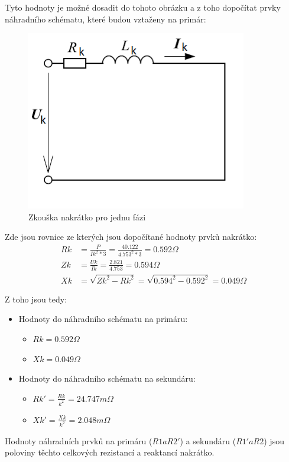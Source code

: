 \documentclass{protokol}
\begin{document}
Tyto hodnoty je možné dosadit do tohoto obrázku a z toho dopočítat prvky náhradního schématu, které budou vztaženy na primár:
\begin{figure}[H]
    \centering
    \includegraphics[width=0.5\linewidth]{ZkouskaNakratko.png}
    \caption{Zkouška nakrátko pro jednu fázi}
    \label{fig:ZkouskaNakratko}
\end{figure}

Zde jsou rovnice ze kterých jsou dopočítané hodnoty prvků nakrátko:
\begin{align}
    Rk &= \frac{P}{Ik^2*3} = \frac{40.122}{4.753^2*3} = 0.592 \Omega \\
    Zk &= \frac{Uk}{Ik} = \frac{2.821}{4.753} = 0.594 \Omega \\
    Xk &= \sqrt{Zk^2 - Rk^2} = \sqrt{0.594^2 - 0.592^2} = 0.049\Omega
    \label{eq:VypocetPrvkuNakratko}
\end{align}

Z toho jsou tedy:
\begin{itemize}
    \item Hodnoty do náhradního schématu na primáru:
    \begin{itemize}
        \item $Rk = 0.592 \Omega$
        \item $Xk = 0.049 \Omega$
    \end{itemize}
    \item Hodnoty do náhradního schématu na sekundáru:
    \begin{itemize}
        \item $Rk' = \frac{Rk}{k^2} = 24.747 m\Omega$
        \item $Xk' = \frac{Xk}{k^2} = 2.048 m\Omega$
    \end{itemize}
\end{itemize}

Hodnoty náhradních prvků na primáru ($R1 a R2'$) a sekundáru ($R1' a R2$) jsou poloviny těchto celkových rezistancí a reaktancí nakrátko. 
\end{document}
